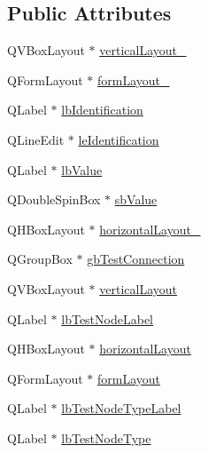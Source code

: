 \subsection*{Public Attributes}
\begin{DoxyCompactItemize}
\item 
Q\-V\-Box\-Layout $\ast$ \hyperlink{class_ui__mdt_tt_test_link_dialog_afca158adb2b606da330ee1f2621e6e92}{vertical\-Layout\-\_}
\item 
Q\-Form\-Layout $\ast$ \hyperlink{class_ui__mdt_tt_test_link_dialog_ab58597fe8f9187ed44b378ced9f1c5e9}{form\-Layout\-\_}
\item 
Q\-Label $\ast$ \hyperlink{class_ui__mdt_tt_test_link_dialog_a1817535e94682d5d6e590169ad18feaf}{lb\-Identification}
\item 
Q\-Line\-Edit $\ast$ \hyperlink{class_ui__mdt_tt_test_link_dialog_a577c136ddb1185384b3d850f8e504880}{le\-Identification}
\item 
Q\-Label $\ast$ \hyperlink{class_ui__mdt_tt_test_link_dialog_a5dc66375bf7acaf3b1ccf26031dba336}{lb\-Value}
\item 
Q\-Double\-Spin\-Box $\ast$ \hyperlink{class_ui__mdt_tt_test_link_dialog_a24249660bb0d0a11397d5e47e9a34833}{sb\-Value}
\item 
Q\-H\-Box\-Layout $\ast$ \hyperlink{class_ui__mdt_tt_test_link_dialog_a95dd2f012e102d301bc5d74b35dd1e99}{horizontal\-Layout\-\_}
\item 
Q\-Group\-Box $\ast$ \hyperlink{class_ui__mdt_tt_test_link_dialog_a27997952a74a4c5c8dbacb75870aea55}{gb\-Test\-Connection}
\item 
Q\-V\-Box\-Layout $\ast$ \hyperlink{class_ui__mdt_tt_test_link_dialog_a72162d9dadbec5b9d50de91a8bbeff76}{vertical\-Layout}
\item 
Q\-Label $\ast$ \hyperlink{class_ui__mdt_tt_test_link_dialog_a1b491804bee627c0517f0cfd47d19bab}{lb\-Test\-Node\-Label}
\item 
Q\-H\-Box\-Layout $\ast$ \hyperlink{class_ui__mdt_tt_test_link_dialog_ae2016e70f10416494ea4a2f8256fae9f}{horizontal\-Layout}
\item 
Q\-Form\-Layout $\ast$ \hyperlink{class_ui__mdt_tt_test_link_dialog_a8289161ceeef8a8330ff077c3db0365f}{form\-Layout}
\item 
Q\-Label $\ast$ \hyperlink{class_ui__mdt_tt_test_link_dialog_a304bf53aeeff26e031977f74bc4923f3}{lb\-Test\-Node\-Type\-Label}
\item 
Q\-Label $\ast$ \hyperlink{class_ui__mdt_tt_test_link_dialog_ad96f863bb060eda0627e0e8c21297520}{lb\-Test\-Node\-Type}

\end{DoxyCompactItemize}
